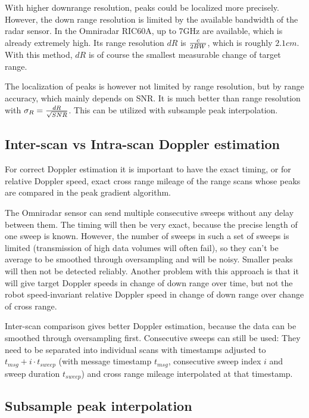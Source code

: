 With higher downrange resolution, peaks could be localized more
precisely. However, the down range resolution is limited by the
available bandwidth of the radar sensor. In the Omniradar RIC60A, up to
7GHz are available, which is already extremely high. Its range
resolution \(dR\) is \(c \over{2 BW}\), which is roughly \(2.1cm\). With
this method, \(dR\) is of course the smallest measurable change of
target range.

The localization of peaks is however not limited by range resolution,
but by range accuracy, which mainly depends on SNR. It is much better
than range resolution with \(\sigma_R = {dR \over{\sqrt{SNR}}}\). This
can be utilized with subsample peak interpolation.

\subsection{Inter-scan vs Intra-scan Doppler
estimation}\label{inter-scan-vs-intra-scan-doppler-estimation}

For correct Doppler estimation it is important to have the exact timing,
or for relative Doppler speed, exact cross range mileage of the range
scans whose peaks are compared in the peak gradient algorithm.

The Omniradar sensor can send multiple consecutive sweeps without any
delay between them. The timing will then be very exact, because the
precise length of one sweep is known. However, the number of sweeps in
such a set of sweeps is limited (transmission of high data volumes will
often fail), so they can't be average to be smoothed through
oversampling and will be noisy. Smaller peaks will then not be detected
reliably. Another problem with this approach is that it will give target
Doppler speeds in change of down range over time, but not the robot
speed-invariant relative Doppler speed in change of down range over
change of cross range.

Inter-scan comparison gives better Doppler estimation, because the data
can be smoothed through oversampling first. Consecutive sweeps can still
be used: They need to be separated into individual scans with timestamps
adjusted to \(t_{msg} + i\cdot t_{sweep}\) (with message timestamp
\(t_{msg}\), consecutive sweep index \(i\) and sweep duration
\(t_{sweep}\)) and cross range mileage interpolated at that timestamp.

\subsection{Subsample peak
interpolation}\label{subsample-peak-interpolation}

